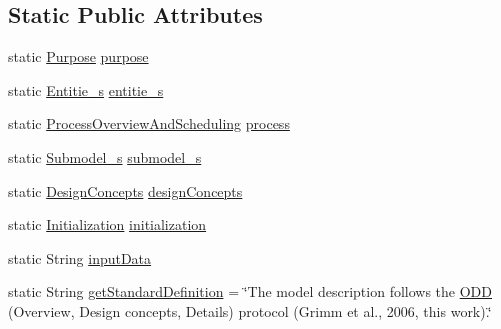 \subsection*{Static Public Attributes}
\begin{DoxyCompactItemize}
\item 
static \hyperlink{classit_1_1isislab_1_1masonhelperdocumentation_1_1_o_d_d_1_1_purpose}{Purpose} \hyperlink{classit_1_1isislab_1_1masonhelperdocumentation_1_1_o_d_d_1_1_o_d_d_a81602d5a0bf0650c69808c4188b4319e}{purpose}
\item 
static \hyperlink{classit_1_1isislab_1_1masonhelperdocumentation_1_1_o_d_d_1_1_entitie__s}{Entitie\-\_\-s} \hyperlink{classit_1_1isislab_1_1masonhelperdocumentation_1_1_o_d_d_1_1_o_d_d_a83f519302af9e043ba9504d5da426410}{entitie\-\_\-s}
\item 
static \hyperlink{classit_1_1isislab_1_1masonhelperdocumentation_1_1_o_d_d_1_1_process_overview_and_scheduling}{Process\-Overview\-And\-Scheduling} \hyperlink{classit_1_1isislab_1_1masonhelperdocumentation_1_1_o_d_d_1_1_o_d_d_a85593fdcad9dba6fb7145ee6759e0a3e}{process}
\item 
static \hyperlink{classit_1_1isislab_1_1masonhelperdocumentation_1_1_o_d_d_1_1_submodel__s}{Submodel\-\_\-s} \hyperlink{classit_1_1isislab_1_1masonhelperdocumentation_1_1_o_d_d_1_1_o_d_d_a1da5e6dcf76e4a83ec91831f5ab98bf2}{submodel\-\_\-s}
\item 
static \hyperlink{classit_1_1isislab_1_1masonhelperdocumentation_1_1_o_d_d_1_1_design_concepts}{Design\-Concepts} \hyperlink{classit_1_1isislab_1_1masonhelperdocumentation_1_1_o_d_d_1_1_o_d_d_a6be57819872ca078db4b2791ef8ddc8f}{design\-Concepts}
\item 
static \hyperlink{classit_1_1isislab_1_1masonhelperdocumentation_1_1_o_d_d_1_1_initialization}{Initialization} \hyperlink{classit_1_1isislab_1_1masonhelperdocumentation_1_1_o_d_d_1_1_o_d_d_a450d24dd94f21b39d4015e570cda5fb2}{initialization}
\item 
static String \hyperlink{classit_1_1isislab_1_1masonhelperdocumentation_1_1_o_d_d_1_1_o_d_d_a003e2cc245212d81de91896a8ce4f440}{input\-Data}
\item 
static String \hyperlink{classit_1_1isislab_1_1masonhelperdocumentation_1_1_o_d_d_1_1_o_d_d_a59845141b2e1b45c7586aa3a3cbc493c}{get\-Standard\-Definition} = \char`\"{}The model description follows the \hyperlink{classit_1_1isislab_1_1masonhelperdocumentation_1_1_o_d_d_1_1_o_d_d}{O\-D\-D} (Overview, Design concepts, Details) protocol (Grimm et al., 2006, this work).\char`\"{}
\end{DoxyCompactItemize}
